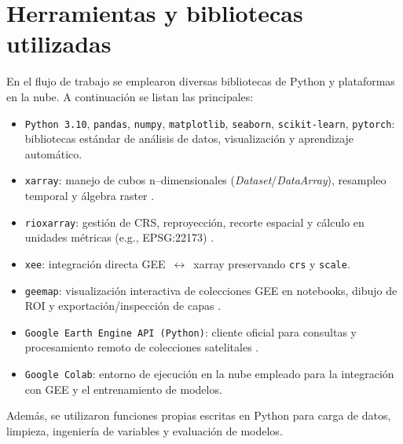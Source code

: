 
\section{Herramientas y bibliotecas utilizadas}

En el flujo de trabajo se emplearon diversas bibliotecas de Python y plataformas en la nube. 
A continuación se listan las principales:

\begin{itemize}
    \item \texttt{Python 3.10}, \texttt{pandas}, \texttt{numpy}, \texttt{matplotlib}, \texttt{seaborn}, \texttt{scikit-learn}, \texttt{pytorch}: bibliotecas estándar de análisis de datos, visualización y aprendizaje automático.
    \item \texttt{xarray}: manejo de cubos n–dimensionales (\textit{Dataset}/\textit{DataArray}), resampleo temporal y álgebra raster \parencite{xarray2020}.
    \item \texttt{rioxarray}: gestión de CRS, reproyección, recorte espacial y cálculo en unidades métricas (e.g., EPSG:22173) \parencite{rioxarray}.
    \item \texttt{xee}: integración directa GEE~$\leftrightarrow$~xarray preservando \texttt{crs} y \texttt{scale}.
    \item \texttt{geemap}: visualización interactiva de colecciones GEE en notebooks, dibujo de ROI y exportación/inspección de capas \parencite{geemap2021}.
    \item \texttt{Google Earth Engine API (Python)}: cliente oficial para consultas y procesamiento remoto de colecciones satelitales \parencite{gorelick2017gee}.
    \item \texttt{Google Colab}: entorno de ejecución en la nube empleado para la integración con GEE y el entrenamiento de modelos.
\end{itemize}

Además, se utilizaron funciones propias escritas en Python para carga de datos, limpieza, ingeniería de variables y evaluación de modelos.




